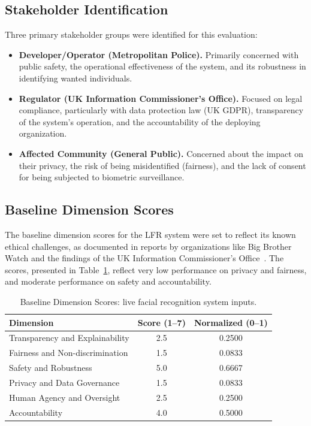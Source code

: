 \subsection{Stakeholder Identification}

Three primary stakeholder groups were identified for this evaluation:

\begin{itemize}[leftmargin=2em]
  \item \textbf{Developer/Operator (Metropolitan Police).} Primarily concerned with public safety, the operational effectiveness of the system, and its robustness in identifying wanted individuals.
  \item \textbf{Regulator (UK Information Commissioner's Office).} Focused on legal compliance, particularly with data protection law (UK GDPR), transparency of the system's operation, and the accountability of the deploying organization.
  \item \textbf{Affected Community (General Public).} Concerned about the impact on their privacy, the risk of being misidentified (fairness), and the lack of consent for being subjected to biometric surveillance.
\end{itemize}

\subsection{Baseline Dimension Scores}

The baseline dimension scores for the LFR system were set to reflect its known ethical challenges, as documented in reports by organizations like Big Brother Watch and the findings of the UK Information Commissioner's Office~\cite{ico2021lfr}. The scores, presented in Table~\ref{tab:cs1_baseline}, reflect very low performance on privacy and fairness, and moderate performance on safety and accountability.

\begin{table}[H]
\centering
\caption{Baseline Dimension Scores: live facial recognition system inputs.}
\label{tab:cs1_baseline}
\begin{tabular}{@{}lcc@{}}
\toprule
\textbf{Dimension} & \textbf{Score (1--7)} & \textbf{Normalized (0--1)} \\
\midrule
Transparency and Explainability   & 2.5 & 0.2500 \\
Fairness and Non-discrimination   & 1.5 & 0.0833 \\
Safety and Robustness             & 5.0 & 0.6667 \\
Privacy and Data Governance       & 1.5 & 0.0833 \\
Human Agency and Oversight        & 2.5 & 0.2500 \\
Accountability                    & 4.0 & 0.5000 \\
\bottomrule
\end{tabular}
\end{table}


